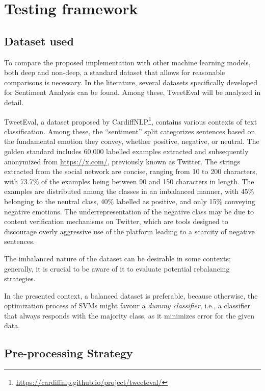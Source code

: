 \chapter{Testing framework}

\section{Dataset used}\label{sec:dataset}

To compare the proposed implementation with other machine learning models, both deep and non-deep, a standard dataset that allows for reasonable comparisons is necessary. In the literature, several datasets specifically developed for Sentiment Analysis can be found. Among these, TweetEval\cite{tweeteval} will be analyzed in detail.

TweetEval, a dataset proposed by CardiffNLP\footnote{\url{https://cardiffnlp.github.io/project/tweeteval/}}, contains various contexts of text classification. Among these, the ``sentiment'' split categorizes sentences based on the fundamental emotion they convey, whether positive, negative, or neutral. The golden standard includes 60,000 labelled examples extracted and subsequently anonymized from \url{https://x.com/}, previously known as Twitter. The strings extracted from the social network are concise, ranging from 10 to 200 characters, with 73.7\% of the examples being between 90 and 150 characters in length. The examples are distributed among the classes in an imbalanced manner, with 45\% belonging to the neutral class, 40\% labelled as positive, and only 15\% conveying negative emotions. The underrepresentation of the negative class may be due to content verification mechanisms on Twitter, which are tools designed to discourage overly aggressive use of the platform leading to a scarcity of negative sentences. 

The imbalanced nature of the dataset can be desirable in some contexts; generally, it is crucial to be aware of it to evaluate potential rebalancing strategies. 

In the presented context, a balanced dataset is preferable, because otherwise, the optimization process of SVMs might favour a \emph{dummy classifier}, i.e., a classifier that always responds with the majority class, as it minimizes error for the given data.

\section{Pre-processing Strategy}


